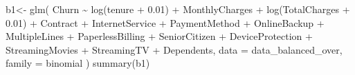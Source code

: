 \documentclass[
  twoside]{article}
\newenvironment{Shaded}{\begin{snugshade}}{\end{snugshade}}
\newcommand{\AttributeTok}[1]{\textcolor[rgb]{0.77,0.63,0.00}{#1}}
\newcommand{\FloatTok}[1]{\textcolor[rgb]{0.00,0.00,0.81}{#1}}
\newcommand{\FunctionTok}[1]{\textcolor[rgb]{0.00,0.00,0.00}{#1}}
\newcommand{\NormalTok}[1]{#1}
\newcommand{\OtherTok}[1]{\textcolor[rgb]{0.56,0.35,0.01}{#1}}
\newcommand{\SpecialCharTok}[1]{\textcolor[rgb]{0.00,0.00,0.00}{#1}}
\begin{document}
\begin{Shaded}
\begin{Highlighting}[]
\NormalTok{b1}\OtherTok{\textless{}{-}} \FunctionTok{glm}\NormalTok{(}
\NormalTok{  Churn }\SpecialCharTok{\textasciitilde{}} \FunctionTok{log}\NormalTok{(tenure }\SpecialCharTok{+} \FloatTok{0.01}\NormalTok{)}
  \SpecialCharTok{+}\NormalTok{ MonthlyCharges}
  \SpecialCharTok{+} \FunctionTok{log}\NormalTok{(TotalCharges }\SpecialCharTok{+} \FloatTok{0.01}\NormalTok{)}
  \SpecialCharTok{+}\NormalTok{ Contract  }\SpecialCharTok{+}\NormalTok{ InternetService }\SpecialCharTok{+}\NormalTok{ PaymentMethod }
  \SpecialCharTok{+}\NormalTok{ OnlineBackup }\SpecialCharTok{+}\NormalTok{ MultipleLines }\SpecialCharTok{+}\NormalTok{ PaperlessBilling }\SpecialCharTok{+}\NormalTok{ SeniorCitizen }
   \SpecialCharTok{+}\NormalTok{ DeviceProtection }\SpecialCharTok{+}\NormalTok{ StreamingMovies }\SpecialCharTok{+}\NormalTok{ StreamingTV }
  \SpecialCharTok{+}\NormalTok{ Dependents,}
  \AttributeTok{data =}\NormalTok{ data\_balanced\_over,}
  \AttributeTok{family =}\NormalTok{ binomial}
\NormalTok{)}
\FunctionTok{summary}\NormalTok{(b1)}
\end{Highlighting}
\end{Shaded}
\end{document}
